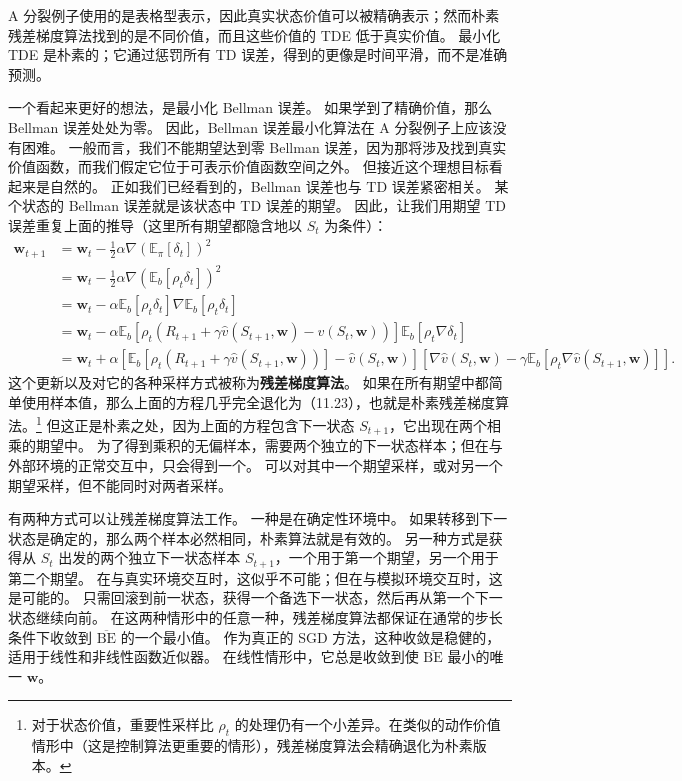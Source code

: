 \documentclass[UTF8,12pt,a4paper,fontset=fandol]{ctexart}
\begin{document}
A 分裂例子使用的是表格型表示，因此真实状态价值可以被精确表示；然而朴素残差梯度算法找到的是不同价值，而且这些价值的 TDE 低于真实价值。
最小化 TDE 是朴素的；它通过惩罚所有 TD 误差，得到的更像是时间平滑，而不是准确预测。

一个看起来更好的想法，是最小化 Bellman 误差。
如果学到了精确价值，那么 Bellman 误差处处为零。
因此，Bellman 误差最小化算法在 A 分裂例子上应该没有困难。
一般而言，我们不能期望达到零 Bellman 误差，因为那将涉及找到真实价值函数，而我们假定它位于可表示价值函数空间之外。
但接近这个理想目标看起来是自然的。
正如我们已经看到的，Bellman 误差也与 TD 误差紧密相关。
某个状态的 Bellman 误差就是该状态中 TD 误差的期望。
因此，让我们用期望 TD 误差重复上面的推导（这里所有期望都隐含地以 $S_t$ 为条件）：
\[
\begin{aligned}
\mathbf{w}_{t+1}
&=\mathbf{w}_t-\frac{1}{2}\alpha\nabla\left(\mathbb{E}_\pi[\delta_t]\right)^2\\
&=\mathbf{w}_t-\frac{1}{2}\alpha\nabla\left(\mathbb{E}_b[\rho_t\delta_t]\right)^2\\
&=\mathbf{w}_t-\alpha\mathbb{E}_b[\rho_t\delta_t]\nabla\mathbb{E}_b[\rho_t\delta_t]\\
&=\mathbf{w}_t-\alpha\mathbb{E}_b[\rho_t(R_{t+1}+\gamma\hat v(S_{t+1},\mathbf{w})-\hat v(S_t,\mathbf{w}))]\mathbb{E}_b[\rho_t\nabla\delta_t]\\
&=\mathbf{w}_t+\alpha\left[\mathbb{E}_b[\rho_t(R_{t+1}+\gamma\hat v(S_{t+1},\mathbf{w}))]-\hat v(S_t,\mathbf{w})\right]
\left[\nabla\hat v(S_t,\mathbf{w})-\gamma\mathbb{E}_b[\rho_t\nabla\hat v(S_{t+1},\mathbf{w})]\right].
\end{aligned}
\]
这个更新以及对它的各种采样方式被称为\textbf{残差梯度算法}。
如果在所有期望中都简单使用样本值，那么上面的方程几乎完全退化为（11.23），也就是朴素残差梯度算法。\footnote{对于状态价值，重要性采样比 $\rho_t$ 的处理仍有一个小差异。在类似的动作价值情形中（这是控制算法更重要的情形），残差梯度算法会精确退化为朴素版本。}
但这正是朴素之处，因为上面的方程包含下一状态 $S_{t+1}$，它出现在两个相乘的期望中。
为了得到乘积的无偏样本，需要两个独立的下一状态样本；但在与外部环境的正常交互中，只会得到一个。
可以对其中一个期望采样，或对另一个期望采样，但不能同时对两者采样。

有两种方式可以让残差梯度算法工作。
一种是在确定性环境中。
如果转移到下一状态是确定的，那么两个样本必然相同，朴素算法就是有效的。
另一种方式是获得从 $S_t$ 出发的两个独立下一状态样本 $S_{t+1}$，一个用于第一个期望，另一个用于第二个期望。
在与真实环境交互时，这似乎不可能；但在与模拟环境交互时，这是可能的。
只需回滚到前一状态，获得一个备选下一状态，然后再从第一个下一状态继续向前。
在这两种情形中的任意一种，残差梯度算法都保证在通常的步长条件下收敛到 $\overline{\mathrm{BE}}$ 的一个最小值。
作为真正的 SGD 方法，这种收敛是稳健的，适用于线性和非线性函数近似器。
在线性情形中，它总是收敛到使 $\overline{\mathrm{BE}}$ 最小的唯一 $\mathbf{w}$。
\end{document}

